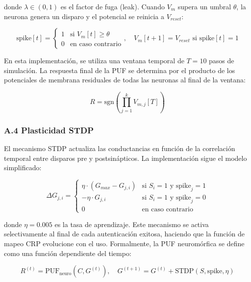 donde $\lambda \in (0,1)$ es el factor de fuga (leak). Cuando $V_m$ supera un umbral $\theta$, la neurona genera un disparo y el potencial se reinicia a $V_{reset}$:

\begin{equation}
    \text{spike}[t] = \begin{cases} 1 & \text{si } V_m[t] \geq \theta \\ 0 & \text{en caso contrario} \end{cases}, \quad V_m[t+1] = V_{reset} \text{ si spike}[t] = 1
    \label{eq:lif_spike}
\end{equation}

En esta implementación, se utiliza una ventana temporal de $T = 10$ pasos de simulación. La respuesta final de la PUF se determina por el producto de los potenciales de membrana residuales de todas las neuronas al final de la ventana:

\begin{equation}
    R = \text{sgn}\left( \prod_{j=1}^{k} V_{m,j}[T] \right)
    \label{eq:puf_response_neuro}
\end{equation}

\subsubsection*{A.4 Plasticidad STDP}

El mecanismo STDP actualiza las conductancias en función de la correlación temporal entre disparos pre y postsinápticos. La implementación sigue el modelo simplificado:

\begin{equation}
    \Delta G_{j,i} = \begin{cases}
        \eta \cdot (G_{max} - G_{j,i}) & \text{si } S_i = 1 \text{ y spike}_j = 1 \\
        -\eta \cdot G_{j,i} & \text{si } S_i = 1 \text{ y spike}_j = 0 \\
        0 & \text{en caso contrario}
    \end{cases}
    \label{eq:stdp}
\end{equation}

donde $\eta = 0.005$ es la tasa de aprendizaje. Este mecanismo se activa selectivamente al final de cada autenticación exitosa, haciendo que la función de mapeo CRP evolucione con el uso. Formalmente, la PUF neuromórfica se define como una función dependiente del tiempo:

\begin{equation}
    R^{(t)} = \text{PUF}_{\text{neuro}}\left(C, G^{(t)}\right), \quad G^{(t+1)} = G^{(t)} + \text{STDP}\left(S, \text{spike}, \eta\right)
    \label{eq:evolving_puf}
\end{equation}

